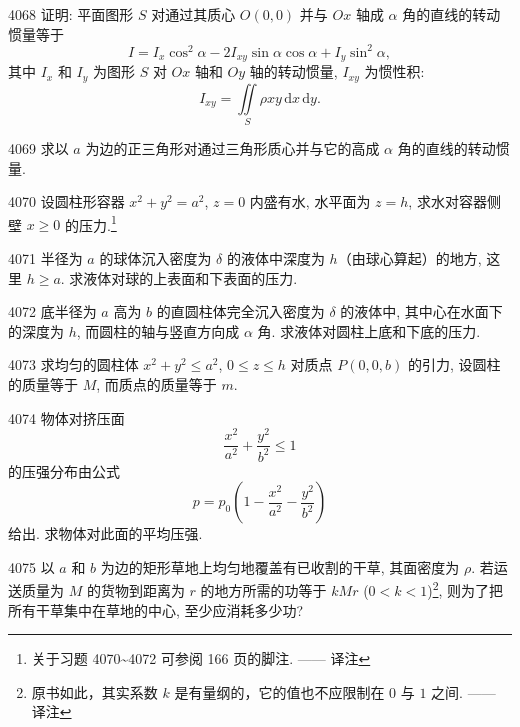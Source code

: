 \begin{prob}[M]{4068}
证明: 平面图形 $S$ 对通过其质心 $O(0,0)$ 并与 $Ox$ 轴成 $\alpha$ 角的直线的转动惯量等于
\[
I = I_x\cos^2\alpha - 2I_{xy}\sin\alpha\cos\alpha + I_y\sin^2\alpha,
\]
其中 $I_x$ 和 $I_y$ 为图形 $S$ 对 $Ox$ 轴和 $Oy$ 轴的转动惯量, $I_{xy}$ 为惯性积:
\[
I_{xy} = \iint\limits_S \rho xy\,\mathrm{d}x\,\mathrm{d}y.
\]
\end{prob}

\begin{prob}[M]{4069}
求以 $a$ 为边的正三角形对通过三角形质心并与它的高成 $\alpha$ 角的直线的转动惯量.
\end{prob}

\begin{prob}[M]{4070}
设圆柱形容器 $x^2 + y^2 = a^2$, $z = 0$ 内盛有水, 水平面为 $z = h$, 求水对容器侧壁 $x \geqslant 0$ 的压力.\footnote{关于习题 4070\textasciitilde 4072 可参阅 166 页的脚注. —— 译注}
\end{prob}

\begin{prob}[M]{4071}
半径为 $a$ 的球体沉入密度为 $\delta$ 的液体中深度为 $h$（由球心算起）的地方, 这里 $h \geqslant a$. 求液体对球的上表面和下表面的压力.
\end{prob}

\begin{prob}[M]{4072}
底半径为 $a$ 高为 $b$ 的直圆柱体完全沉入密度为 $\delta$ 的液体中, 其中心在水面下的深度为 $h$, 而圆柱的轴与竖直方向成 $\alpha$ 角. 求液体对圆柱上底和下底的压力.
\end{prob}

\begin{prob}[M]{4073}
求均匀的圆柱体 $x^2 + y^2 \leqslant a^2$, $0 \leqslant z \leqslant h$ 对质点 $P(0,0,b)$ 的引力, 设圆柱的质量等于 $M$, 而质点的质量等于 $m$.
\end{prob}

\begin{prob}[M]{4074}
物体对挤压面
\[
\frac{x^2}{a^2} + \frac{y^2}{b^2} \leqslant 1
\]
的压强分布由公式
\[
p = p_0\left(1 - \frac{x^2}{a^2} - \frac{y^2}{b^2}\right)
\]
给出. 求物体对此面的平均压强.
\end{prob}

\begin{prob}[M]{4075}
以 $a$ 和 $b$ 为边的矩形草地上均匀地覆盖有已收割的干草, 其面密度为 $\rho$. 若运送质量为 $M$ 的货物到距离为 $r$ 的地方所需的功等于 $kMr$ ($0 < k < 1$)\footnote{原书如此，其实系数 $k$ 是有量纲的，它的值也不应限制在 $0$ 与 $1$ 之间. —— 译注}, 则为了把所有干草集中在草地的中心, 至少应消耗多少功?
\end{prob}

